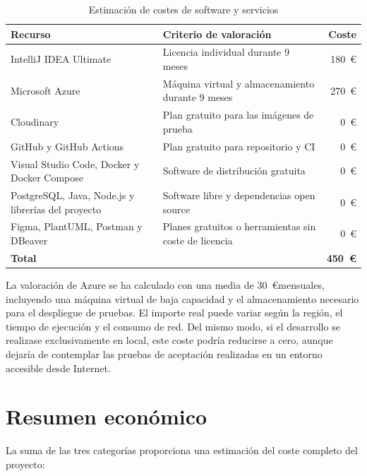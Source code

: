 \begin{table}[H]
    \centering
    \caption{Estimación de costes de software y servicios}
    \label{tab:costes_software}
    \begin{tabular}{|p{6.3cm}|p{4.2cm}|r|}
        \hline
        \textbf{Recurso} & \textbf{Criterio de valoración} & \textbf{Coste} \\
        \hline
        IntelliJ IDEA Ultimate & Licencia individual durante 9 meses & 180~\euro \\
        \hline
        Microsoft Azure & Máquina virtual y almacenamiento durante 9 meses & 270~\euro \\
        \hline
        Cloudinary & Plan gratuito para las imágenes de prueba & 0~\euro \\
        \hline
        GitHub y GitHub Actions & Plan gratuito para repositorio y CI & 0~\euro \\
        \hline
        Visual Studio Code, Docker y Docker Compose & Software de distribución gratuita & 0~\euro \\
        \hline
        PostgreSQL, Java, Node.js y librerías del proyecto & Software libre y dependencias open source & 0~\euro \\
        \hline
        Figma, PlantUML, Postman y DBeaver & Planes gratuitos o herramientas sin coste de licencia & 0~\euro \\
        \hline
        \textbf{Total} & & \textbf{450~\euro} \\
        \hline
    \end{tabular}
\end{table}

La valoración de Azure se ha calculado con una media de 30~\euro mensuales, incluyendo una máquina virtual de baja capacidad y el almacenamiento necesario para el despliegue de pruebas. El importe real puede variar según la región, el tiempo de ejecución y el consumo de red. Del mismo modo, si el desarrollo se realizase exclusivamente en local, este coste podría reducirse a cero, aunque dejaría de contemplar las pruebas de aceptación realizadas en un entorno accesible desde Internet.

\section{Resumen económico}
\label{sec:resumen_costes}

La suma de las tres categorías proporciona una estimación del coste completo del proyecto:

